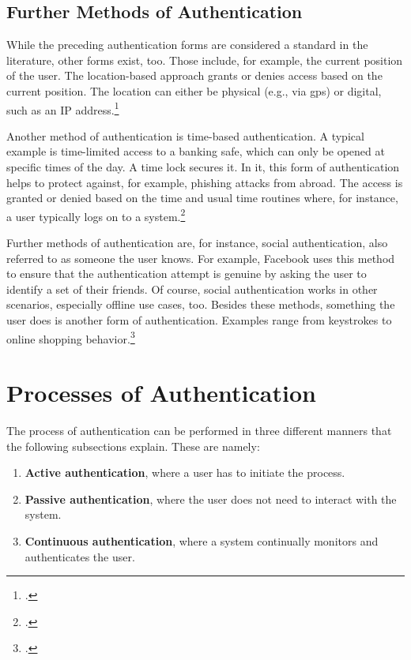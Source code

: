 \subsection{Further Methods of Authentication}

While the preceding authentication forms are considered a standard in the literature, other forms exist, too. Those include, for example, the current position of the user. The location-based approach grants or denies access based on the current position. The location can either be physical (e.g., via \gls{gps}) or digital, such as an IP address.\footcites[See][]{6296127}[See][Chapter 13.9]{2308830}

Another method of authentication is time-based authentication. A typical example is time-limited access to a banking safe, which can only be opened at specific times of the day. A time lock secures it. In \gls{it}, this form of authentication helps to protect against, for example, phishing attacks from abroad. The access is granted or denied based on the time and usual time routines where, for instance, a user typically logs on to a system.\footcite[See][191]{dasgupta2017multi}

Further methods of authentication are, for instance, social authentication, also referred to as \frqq someone the user knows\flqq. For example, Facebook uses this method to ensure that the authentication attempt is genuine by asking the user to identify a set of their friends. Of course, social authentication works in other scenarios, especially offline use cases, too. Besides these methods, \frqq something the user does\flqq{} is another form of authentication. Examples range from keystrokes to online shopping behavior.\footcites[See][]{Brainard2006}[See][278--279]{shostack2014threat}[See][]{10.1007/978-3-642-18178-8_9}[See][]{7460349}

\section{Processes of Authentication}

The process of authentication can be performed in three different manners that the following subsections explain. These are namely:

\begin{enumerate}
	\item \textbf{Active authentication}, where a user has to initiate the process.
	\item \textbf{Passive authentication}, where the user does not need to interact with the system.
	\item \textbf{Continuous authentication}, where a system continually monitors and authenticates the user.
\end{enumerate}

